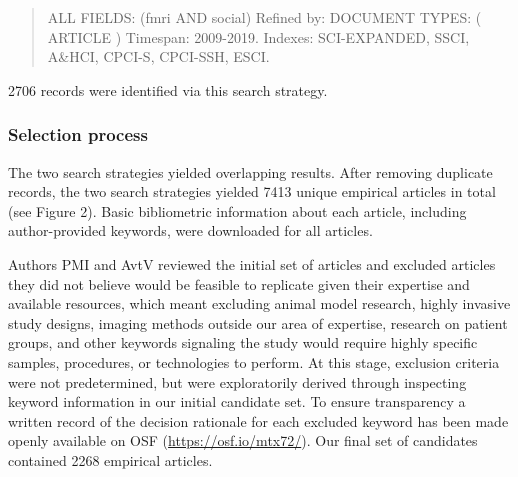\documentclass[
  man,floatsintext]{apa6}
\begin{document}
\begin{quote}
ALL FIELDS: (fmri AND social)
Refined by: DOCUMENT TYPES: ( ARTICLE )
Timespan: 2009-2019. Indexes: SCI-EXPANDED, SSCI, A\&HCI, CPCI-S, CPCI-SSH, ESCI.
\end{quote}

2706 records were identified via this search strategy.

\hypertarget{selection-process}{%
\subsubsection{Selection process}\label{selection-process}}

The two search strategies yielded overlapping results. After removing duplicate records, the two search strategies yielded 7413 unique empirical articles in total (see Figure 2). Basic bibliometric information about each article, including author-provided keywords, were downloaded for all articles.

Authors PMI and AvtV reviewed the initial set of articles and excluded articles they did not believe would be feasible to replicate given their expertise and available resources, which meant excluding animal model research, highly invasive study designs, imaging methods outside our area of expertise, research on patient groups, and other keywords signaling the study would require highly specific samples, procedures, or technologies to perform. At this stage, exclusion criteria were not predetermined, but were exploratorily derived through inspecting keyword information in our initial candidate set. To ensure transparency a written record of the decision rationale for each excluded keyword has been made openly available on OSF (\url{https://osf.io/mtx72/}). Our final set of candidates contained 2268 empirical articles.
\end{document}
